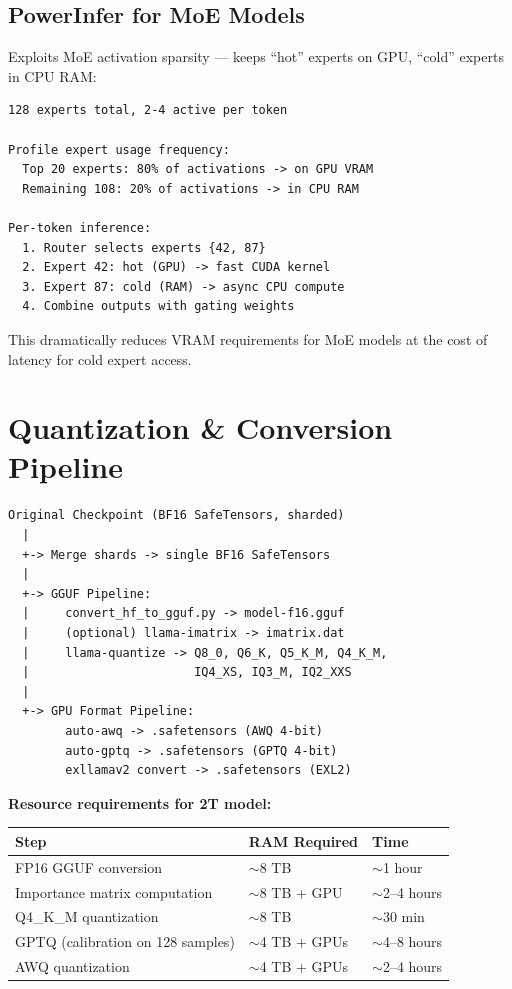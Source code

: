 \documentclass[11pt,a4paper]{article}
\begin{document}
\subsection{PowerInfer for MoE Models}

Exploits MoE activation sparsity --- keeps ``hot'' experts on GPU, ``cold'' experts in CPU RAM:

\begin{lstlisting}[basicstyle=\ttfamily\small, caption={PowerInfer MoE Strategy}]
128 experts total, 2-4 active per token

Profile expert usage frequency:
  Top 20 experts: 80% of activations -> on GPU VRAM
  Remaining 108: 20% of activations -> in CPU RAM

Per-token inference:
  1. Router selects experts {42, 87}
  2. Expert 42: hot (GPU) -> fast CUDA kernel
  3. Expert 87: cold (RAM) -> async CPU compute
  4. Combine outputs with gating weights
\end{lstlisting}

This dramatically reduces VRAM requirements for MoE models at the cost of latency for cold expert access.

\section{Quantization \& Conversion Pipeline}

\begin{tcolorbox}[colback=gray!5, colframe=gray!60!black, title={\bfseries End-to-End Model Conversion Pipeline}]
\begin{lstlisting}[basicstyle=\ttfamily\small, frame=none, backgroundcolor=\color{gray!5}]
Original Checkpoint (BF16 SafeTensors, sharded)
  |
  +-> Merge shards -> single BF16 SafeTensors
  |
  +-> GGUF Pipeline:
  |     convert_hf_to_gguf.py -> model-f16.gguf
  |     (optional) llama-imatrix -> imatrix.dat
  |     llama-quantize -> Q8_0, Q6_K, Q5_K_M, Q4_K_M,
  |                       IQ4_XS, IQ3_M, IQ2_XXS
  |
  +-> GPU Format Pipeline:
        auto-awq -> .safetensors (AWQ 4-bit)
        auto-gptq -> .safetensors (GPTQ 4-bit)
        exllamav2 convert -> .safetensors (EXL2)
\end{lstlisting}
\end{tcolorbox}

\textbf{Resource requirements for 2T model:}
\begin{center}
\begin{tabular}{lll}
\toprule
\textbf{Step} & \textbf{RAM Required} & \textbf{Time} \\
\midrule
FP16 GGUF conversion & $\sim$8 TB & $\sim$1 hour \\
Importance matrix computation & $\sim$8 TB + GPU & $\sim$2--4 hours \\
Q4\_K\_M quantization & $\sim$8 TB & $\sim$30 min \\
GPTQ (calibration on 128 samples) & $\sim$4 TB + GPUs & $\sim$4--8 hours \\
AWQ quantization & $\sim$4 TB + GPUs & $\sim$2--4 hours \\
\bottomrule
\end{tabular}
\end{center}
\end{document}
